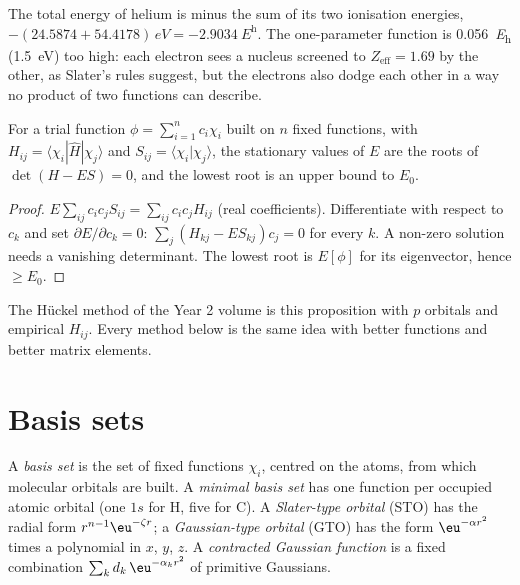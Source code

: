 \begin{example}\label{ex:b3:computational-chemistry:helium}
The total energy of helium is minus the sum of its two ionisation energies,
$-(24.5874 + 54.4178)\,\unit{eV} = \qty{-2.9034}{\hartree}$. The one-parameter
function is \qty{0.056}{\hartree} (\qty{1.5}{eV}) too high: each electron sees a
nucleus screened to $Z_{\mathrm{eff}} = 1.69$ by the other, as Slater's rules
suggest, but the electrons also dodge each other in a way no product of two
functions can describe.
\end{example}

\begin{proposition}\label{prop:b3:computational-chemistry:linear-variation}
For a trial function $\phi = \sum_{i=1}^n c_i\chi_i$ built on $n$ fixed functions,
with $H_{ij} = \langle\chi_i|\hat H|\chi_j\rangle$ and $S_{ij} = \langle\chi_i|\chi_j
\rangle$, the stationary values of $E$ are the roots of $\det(H - ES) = 0$, and
the lowest root is an upper bound to $E_0$.
\end{proposition}

\begin{proof}
$E\sum_{ij}c_ic_jS_{ij} = \sum_{ij}c_ic_jH_{ij}$ (real coefficients). Differentiate
with respect to $c_k$ and set $\partial E/\partial c_k = 0$: $\sum_j(H_{kj} -
ES_{kj})c_j = 0$ for every $k$. A non-zero solution needs a vanishing
determinant. The lowest root is $E[\phi]$ for its eigenvector, hence $\ge E_0$.
\end{proof}

The Hückel method of the Year 2 volume is this proposition with $p$
orbitals and empirical $H_{ij}$. Every method below is the same idea with
better functions and better matrix elements.

\section{Basis sets}

\begin{definition}\label{def:b3:computational-chemistry:basis}
A \emph{basis set} is the set of fixed functions $\chi_i$,
centred on the atoms, from which molecular orbitals are built. A
\emph{minimal basis set} has one function per
occupied atomic orbital (one $1s$ for H, five for C). A \emph{Slater-type
orbital} (STO) has the radial form
$r^{n-1}\eu^{-\zeta r}$; a \emph{Gaussian-type orbital}
(GTO) has the form $\eu^{-\alpha r^2}$ times a polynomial in $x$, $y$,
$z$. A \emph{contracted Gaussian function}
is a fixed combination $\sum_kd_k\,\eu^{-\alpha_kr^2}$ of primitive Gaussians.
\end{definition}

